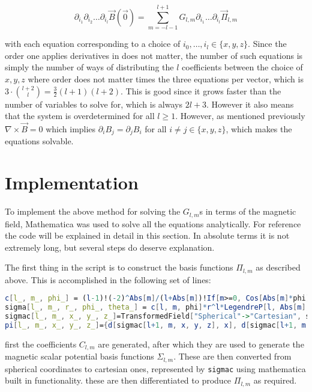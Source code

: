 \documentclass{article}
\begin{document}
\begin{equation}
    \partial_{i_1}\partial_{i_2}\ldots\partial_{i_l}\vec B(\vec0)=\sum_{m=-l-1}^{l+1}G_{l, m}\partial_{i_1}\ldots\partial_{i_l}\vec\Pi_{l, m}
\end{equation}

with each equation corresponding to a choice of $i_0, \ldots, i_l\in \{x, y, z\}$. Since the order one applies derivatives in does not matter, the number of such equations is simply the number of ways of distributing the $l$ coefficients between the choice of ${x, y, z}$ where order does not matter times the three equations per vector, which is $3\cdot{{l+2}\choose{l}}=\frac32(l+1)(l+2)$. This is good since it grows faster than the number of variables to solve for, which is always $2l+3$. However it also means that the system is overdetermined for all $l\geq1$. However, as mentioned previously $\nabla\times\vec B=0$ which implies $\partial_iB_j=\partial_jB_i$ for all $i\neq j\in\{x, y, z\}$, which makes the equations solvable. 

\section{Implementation}

To implement the above method for solving the $G_{l,m}$s in terms of the magnetic field, Mathematica was used to solve all the equations analytically. For reference the code will be explained in detail in this section. In absolute terms it is not extremely long, but several steps do deserve explanation. 

The first thing in the script is to construct the basis functions $\Pi_{l, m}$ as described above. This is accomplished in the following set of lines: 

\begin{lstlisting}[language=Mathematica]
c[l_, m_, phi_] = (l-1)!(-2)^Abs[m]/(l+Abs[m])!If[m>=0, Cos[Abs[m]*phi], Sin[Abs[m]*phi]];
sigma[l_, m_, r_, phi_, theta_] = c[l, m, phi]*r^l*LegendreP[l, Abs[m], Cos[theta]];
sigmac[l_, m_, x_, y_, z_]=TransformedField["Spherical"->"Cartesian", sigma[l, m, r, phi, theta], {r, theta, phi}->{x, y, z}];
pi[l_, m_, x_, y_, z_]={d[sigmac[l+1, m, x, y, z], x], d[sigmac[l+1, m, x, y, z], y], d[sigmac[l+1, m, x, y, z], z]};
\end{lstlisting}

first the coefficients $C_{l, m}$ are generated, after which they are used to generate the magnetic scalar potential basis functions $\Sigma_{l, m}$. These are then converted from spherical coordinates to cartesian ones, represented by \lstinline{sigmac} using mathematica built in functionality. these are then differentiated to produce $\Pi_{l, m}$ as required. 
\end{document}

